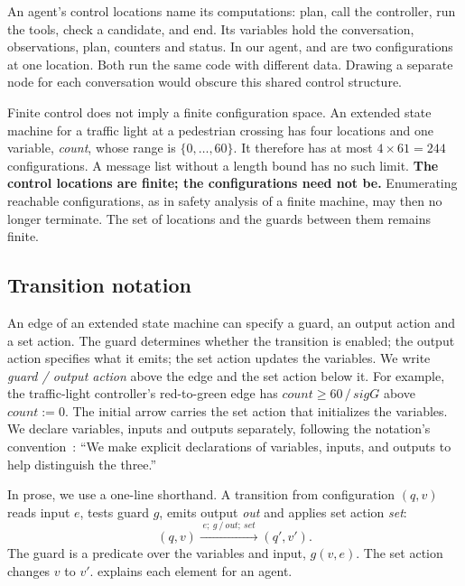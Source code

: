 An agent's control locations name its computations: plan, call the controller, run the tools,
check a candidate, and end. Its variables hold the conversation, observations, plan, counters and
status. In our agent,  and
 are two configurations at one location. Both run the
same code with different data. Drawing a separate node for each conversation would obscure this
shared control structure.

Finite control does not imply a finite configuration space. An extended state machine for a
traffic light at a pedestrian crossing has four locations and one variable, \emph{count}, whose
range is $\{0, \ldots, 60\}$. It therefore has at most $4 \times 61 = 244$ configurations. A message
list without a length bound has no such limit. \textbf{The control locations are finite; the
configurations need not be.} Enumerating reachable configurations, as in safety analysis of a
finite machine, may then no longer terminate. The set of locations and the guards between
them remains finite.

\subsection{Transition notation}
\label{sec:efsm-notation}

An edge of an extended state machine can specify a guard, an output action and a set action. The
guard determines whether the transition is enabled; the output action specifies what it emits;
the set action updates the variables. We write \emph{guard / output action} above the edge and the
set action below it. For example, the traffic-light controller's red-to-green edge has
$\mathit{count} \geq 60 \,/\, \mathit{sigG}$ above $\mathit{count} := 0$.
The initial arrow carries the set action that initializes the variables. We declare variables,
inputs and outputs separately, following the notation's convention~\citep[slides~5--6]{seshia2015extended}: ``We make explicit declarations of variables, inputs,
and outputs to help distinguish the three.''

In prose, we use a one-line shorthand. A transition from configuration $(q, v)$ reads input $e$,
tests guard $g$, emits output \emph{out} and applies set action \emph{set}:
\[
  (q, v) \xrightarrow{\;e;\ g\ /\ \mathit{out};\ \mathit{set}\;} (q', v').
\]
The guard is a predicate over the variables and input, $g(v, e)$. The set action changes $v$ to
$v'$.  explains each element for an agent.

